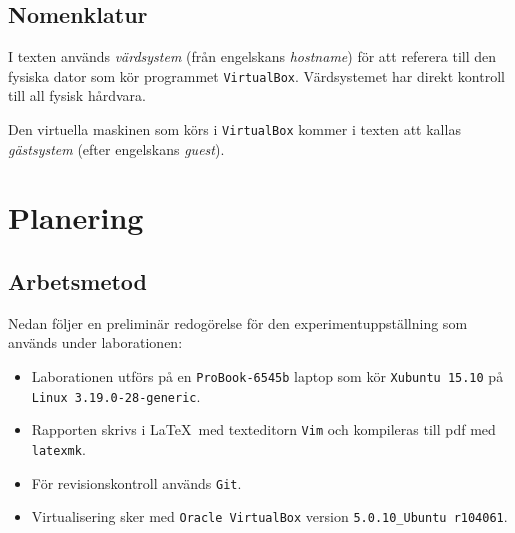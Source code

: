 \subsection{Nomenklatur}
I texten används \emph{värdsystem} (från engelskans \emph{hostname}) för att
referera till den fysiska dator som kör programmet \texttt{VirtualBox}.
Värdsystemet har direkt kontroll till all fysisk hårdvara.
\par Den virtuella maskinen som körs i \texttt{VirtualBox} kommer i texten att
kallas \emph{gästsystem} (efter engelskans \emph{guest}).


\section{Planering}


\subsection{Arbetsmetod}

Nedan följer en preliminär redogörelse för den experimentuppställning som används
under laborationen:

\begin{itemize}
  \item Laborationen utförs på en \texttt{ProBook-6545b} laptop som kör
        \texttt{Xubuntu 15.10} på \texttt{Linux 3.19.0-28-generic}.

  \item Rapporten skrivs i \LaTeX\ med texteditorn \texttt{Vim} och kompileras
        till pdf med \texttt{latexmk}.

  \item För revisionskontroll används \texttt{Git}.

  \item Virtualisering sker med \texttt{Oracle VirtualBox} version
        \texttt{5.0.10\_Ubuntu r104061}.

\end{itemize}
